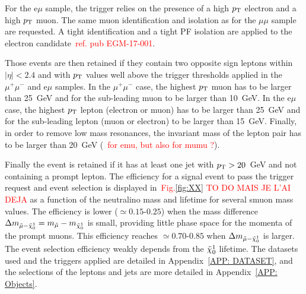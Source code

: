 \documentclass{cernatlasnote}
\newcommand{\mumu}{\ensuremath{\mu^{+}\mu^{-}}}
\newcommand{\dmass}{$\Delta m_{\Tilde{\mu}-\Tilde{\chi}^{1}_{0}}$\xspace}
\newcommand{\neutralino}{$\Tilde{\chi}^{1}_{0}$\xspace}
\newcommand{\pt}{$p_{\text T}$\xspace}
\begin{document}
For the e$\mu$ sample, the trigger relies on the presence of a high \pt electron and a high \pt muon. The same muon identification and isolation as for the $\mu\mu$ sample are requested. 
A tight identification and a tight PF isolation are applied to the electron candidate~\textcolor{red}{ref. pub EGM-17-001}.

Those events are then retained if they contain two opposite sign leptons within $|\eta| < 2.4$ and  with \pt values well above the trigger thresholds applied in the $\mumu$ and e$\mu$ samples. 
In the $\mumu$ case, the highest \pt muon has to be larger than 25~GeV and for the sub-leading muon to be larger than 10~GeV. 
In the e$\mu$ case, the highest \pt lepton (electron or muon) has to be larger than 25~GeV and for the sub-leading lepton (muon or electron) to be larger than 15~GeV. 
Finally, in order to remove low mass resonances, the invariant mass of the lepton pair has to be larger than 20~GeV (~\textcolor{red}{for emu, but also for mumu ?}). 

Finally the event is retained if it has at least one jet with $p_{\text T} > 20$~GeV and not containing a prompt lepton. 
The efficiency for a signal event to pass the trigger request and event selection is displayed in~\textcolor{red}{Fig.\ref{fig:XX} TO DO MAIS JE L'AI DEJA} as a function of the neutralino mass and lifetime for several smuon mass values. The efficiency is lower ($\simeq0.15$-$0.25$) when the mass difference $\Delta m_{\Tilde{\mu}-\Tilde{\chi}^{1}_{0}} = m_{\Tilde{\mu}} - m_{\Tilde{\chi}^{1}_{0}}$ is small, providing little phase space for the momenta of the prompt muons. This efficiency reaches $\simeq0.70$-$0.85$ when \dmass is larger. The event selection efficiency weakly depends from the \neutralino lifetime.
\smallskip \newline
The datasets used and the triggers applied are detailed in Appendix~\ref{APP: DATASET}, and the selections of the leptons and jets are more detailed in Appendix~\ref{APP: Objects}. 


\end{document}
